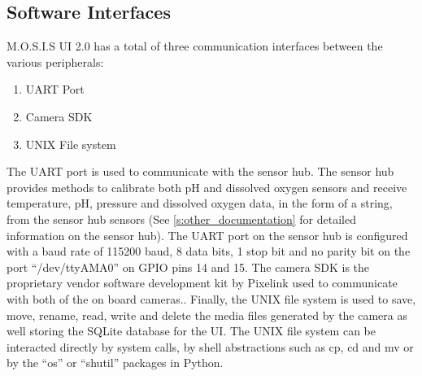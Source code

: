 \subsection{Software Interfaces}
M.O.S.I.S UI 2.0 has a total of three communication interfaces between the various peripherals:
\begin{enumerate}
\item UART Port
\item Camera SDK
\item UNIX File system
\end{enumerate}
The UART port is used to communicate with the sensor hub. The sensor hub provides methods to calibrate both pH and dissolved oxygen sensors and receive temperature, pH, pressure and dissolved oxygen data, in the form of a string, from the sensor hub sensors (See \ref{s:other_documentation} for detailed information on the sensor hub). The UART port on the sensor hub is configured with a baud rate of 115200 baud, 8 data bits, 1 stop bit and no parity bit on the port ``/dev/ttyAMA0'' on GPIO pins 14 and 15.\cite{UARTRaspberryPi} The camera SDK is the proprietary vendor software development kit by Pixelink used to communicate with both of the on board cameras.\cite{WhatFunctionsFeatures}. Finally, the UNIX file system is used to save, move, rename, read, write and delete the media files generated by the camera as well storing the SQLite database for the UI. The UNIX file system can be interacted directly by system calls, by shell abstractions such as cp, cd and mv or by the ``os'' or ``shutil'' packages in Python.\cite{SystemCallsUnix}\cite{UnixShellSummary}\cite{OsMiscellaneousOperating}\cite{ShutilHighlevelFile}
